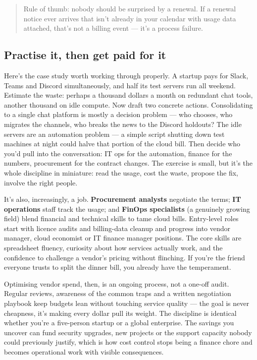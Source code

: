 \begin{quote}\small
Rule of thumb: nobody should be surprised by a renewal. If a renewal notice ever arrives that isn't already in your calendar with usage data attached, that's not a billing event — it's a process failure.
\end{quote}



\subsection{Practise it, then get paid for it}


Here's the case study worth working through properly. A startup pays for Slack, Teams and Discord simultaneously, and half its test servers run all weekend. Estimate the waste: perhaps a thousand dollars a month on redundant chat tools, another thousand on idle compute. Now draft two concrete actions. Consolidating to a single chat platform is mostly a decision problem — who chooses, who migrates the channels, who breaks the news to the Discord holdouts? The idle servers are an automation problem — a simple script shutting down test machines at night could halve that portion of the cloud bill. Then decide who you'd pull into the conversation: IT ops for the automation, finance for the numbers, procurement for the contract changes. The exercise is small, but it's the whole discipline in miniature: read the usage, cost the waste, propose the fix, involve the right people.


It's also, increasingly, a job. \textbf{Procurement analysts} negotiate the terms; \textbf{IT operations} staff track the usage; and \textbf{FinOps specialists} (a genuinely growing field) blend financial and technical skills to tame cloud bills. Entry-level roles start with licence audits and billing-data cleanup and progress into vendor manager, cloud economist or IT finance manager positions. The core skills are spreadsheet fluency, curiosity about how services actually work, and the confidence to challenge a vendor's pricing without flinching. If you're the friend everyone trusts to split the dinner bill, you already have the temperament.


Optimising vendor spend, then, is an ongoing process, not a one-off audit. Regular reviews, awareness of the common traps and a written negotiation playbook keep budgets lean without touching service quality — the goal is never cheapness, it's making every dollar pull its weight. The discipline is identical whether you're a five-person startup or a global enterprise. The savings you uncover can fund security upgrades, new projects or the support capacity nobody could previously justify, which is how cost control stops being a finance chore and becomes operational work with visible consequences.

